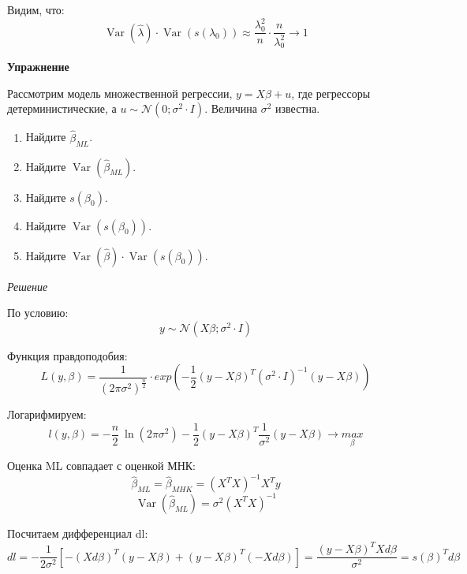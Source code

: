 \documentclass[12pt]{article} %
\theoremstyle{definition} %
\DeclareMathOperator{\Var}{Var}
\def \hlambda{\hat{\lambda}}
\def \hbeta{\hat{\beta}}
\def \cN{\mathcal{N}}
\begin{document}
Видим, что:
\begin{equation}
    \Var (\hlambda) \cdot \Var (s(\lambda_0)) \approx \dfrac{\lambda_0^2}{n} \cdot \dfrac{n}{\lambda_0^2} \to 1
  \end{equation}
  
\bigskip
\textbf{Упражнение}

Рассмотрим модель множественной регрессии, $y=X\beta + u$, где регрессоры детерминистические, а $u \sim \cN(0; \sigma^2 \cdot I)$.
Величина $\sigma^2$ известна. 

\begin{enumerate}
\item Найдите $\hbeta_{ML}$.
\item Найдите $\Var (\hbeta_{ML})$.
\item Найдите $s(\beta_0)$.
\item Найдите $\Var (s(\beta_0))$.
\item Найдите $\Var (\hbeta) \cdot \Var (s(\beta_0))$.
\end{enumerate}

\medskip    
\emph{Решение}

По условию:
 \begin{equation}
    y \sim \cN(X\beta; \sigma^2 \cdot I) 
\end{equation}

Функция правдоподобия:
\begin{equation}
    L (y, \beta) = \dfrac{1}{(2\pi \sigma^2)^{\frac{n}{2}}} \cdot exp(-\dfrac{1}{2}(y-X\beta)^{T} (\sigma^2 \cdot I)^{-1} (y-X\beta))
  \end{equation}
  
Логарифмируем:
\begin{equation}
    l (y, \beta) = -\dfrac{n}{2} \: \ln(2\pi \sigma^2) -\dfrac{1}{2}(y-X\beta)^{T} \dfrac{1}{\sigma^2} (y-X\beta) \to \underset{\beta}{max}
  \end{equation}
  
Оценка ML совпадает с оценкой МНК:
\begin{equation}
    \hbeta_{ML} = \hbeta_{MHK} = (X^T X)^{-1} X^{T} y
  \end{equation}
\begin{equation}
    \Var (\hbeta_{ML}) = \sigma^2 (X^T X)^{-1}
  \end{equation}
  
Посчитаем дифференциал dl:
\begin{equation}
   dl = -\dfrac{1}{2\sigma^2} [-(X d\beta)^T (y-X\beta) + (y-X\beta)^T (-X d\beta)] = \dfrac{(y-X\beta)^T X d\beta}{\sigma^2} = s(\beta)^T d\beta
  \end{equation}
  
\end{document}
